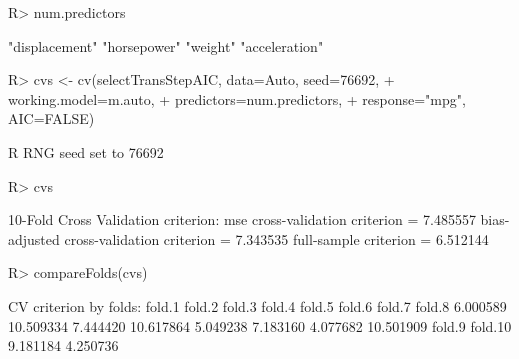 \documentclass[
]{jss}
\begin{document}
\begin{CodeChunk}
\begin{CodeInput}
R> num.predictors
\end{CodeInput}
\begin{CodeOutput}
[1] "displacement" "horsepower"   "weight"       "acceleration"
\end{CodeOutput}
\begin{CodeInput}
R> cvs <- cv(selectTransStepAIC, data=Auto, seed=76692, 
+           working.model=m.auto,
+           predictors=num.predictors,
+           response="mpg", AIC=FALSE)
\end{CodeInput}
\begin{CodeOutput}
R RNG seed set to 76692
\end{CodeOutput}
\begin{CodeInput}
R> cvs
\end{CodeInput}
\begin{CodeOutput}
10-Fold Cross Validation
criterion: mse
cross-validation criterion = 7.485557
bias-adjusted cross-validation criterion = 7.343535
full-sample criterion = 6.512144 
\end{CodeOutput}
\begin{CodeInput}
R> compareFolds(cvs)
\end{CodeInput}
\begin{CodeOutput}
CV criterion by folds:
   fold.1    fold.2    fold.3    fold.4    fold.5    fold.6    fold.7    fold.8 
 6.000589 10.509334  7.444420 10.617864  5.049238  7.183160  4.077682 10.501909 
   fold.9   fold.10 
 9.181184  4.250736 


\end{CodeOutput}
\end{CodeChunk}
\end{document}
